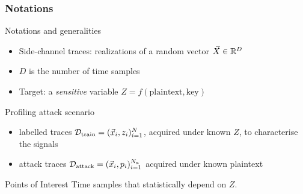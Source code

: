 \begin{frame}
\frametitle{Notations}
\begin{block}{Notations and generalities}
\begin{itemize}
\item Side-channel traces: realizations of a random vector $\vec{X} \in \mathbb{R}^D$  
\item $D$ is the number of time samples
\item Target: a \emph{sensitive} variable $Z = f(\mathrm{plaintext,key})$ 
\end{itemize}
\end{block}
\vspace{-5pt}
\begin{block}{Profiling attack scenario}
\begin{itemize}
\item labelled traces $\mathcal{D}_{\text{train}} = (\vec{x}_i, z_i)_{i=1}^N$, acquired under known $Z$, to characterise the signals
\item attack traces $\mathcal{D}_{\text{attack}} = (\vec{x}_i, p_i)_{i=1}^{N_a}$ acquired under known plaintext
\end{itemize}
\end{block}
\pause
\begin{block}{Points of Interest}
Time samples that statistically depend on $Z$.
\end{block}
\end{frame}




